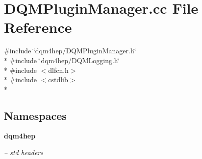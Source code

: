 \section{D\+Q\+M\+Plugin\+Manager.\+cc File Reference}
\label{DQMPluginManager_8cc}
{\ttfamily \#include \char`\"{}dqm4hep/\+D\+Q\+M\+Plugin\+Manager.\+h\char`\"{}}\\*
{\ttfamily \#include \char`\"{}dqm4hep/\+D\+Q\+M\+Logging.\+h\char`\"{}}\\*
{\ttfamily \#include $<$dlfcn.\+h$>$}\\*
{\ttfamily \#include $<$cstdlib$>$}\\*
\subsection*{Namespaces}
\begin{DoxyCompactItemize}
\item 
 {\bf dqm4hep}
\begin{DoxyCompactList}\small\item\em -- std headers \end{DoxyCompactList}\end{DoxyCompactItemize}

